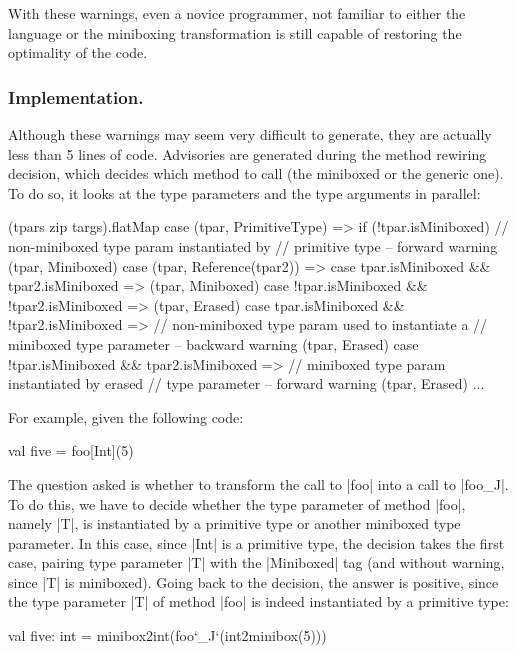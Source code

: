 With these warnings, even a novice programmer, not familiar to either the language or the miniboxing transformation is still capable of restoring the optimality of the code.

\subsubsection{Implementation.} Although these warnings may seem very difficult to generate, they are actually less than 5 lines of code. Advisories are generated during the method rewiring decision, which decides which method to call (the miniboxed or the generic one). To do so, it looks at the type parameters and the type arguments in parallel:

\begin{lstlisting-nobreak}
 (tpars zip targs).flatMap {
   case (tpar, PrimitiveType) =>
     if (!tpar.isMiniboxed)
       // non-miniboxed type param instantiated by
       // primitive type -- forward warning
     (tpar, Miniboxed)
   case (tpar, Reference(tpar2)) =>
     case tpar.isMiniboxed && tpar2.isMiniboxed =>
       (tpar, Miniboxed)
     case !tpar.isMiniboxed && !tpar2.isMiniboxed =>
       (tpar, Erased)
     case tpar.isMiniboxed && !tpar2.isMiniboxed =>
       // non-miniboxed type param used to instantiate a
       // miniboxed type parameter -- backward warning
       (tpar, Erased)
     case !tpar.isMiniboxed && tpar2.isMiniboxed =>
       // miniboxed type param instantiated by erased
       // type parameter -- forward warning
       (tpar, Erased)
   ...
 }
\end{lstlisting-nobreak}

For example, given the following code:

\begin{lstlisting-nobreak}
 val five = foo[Int](5)
\end{lstlisting-nobreak}

The question asked is whether to transform the call to |foo| into a call to |foo_J|. To do this, we have to decide whether the type parameter of method |foo|, namely |T|, is instantiated by a primitive type or another miniboxed type parameter. In this case, since |Int| is a primitive type, the decision takes the first case, pairing type parameter |T| with the |Miniboxed| tag (and without warning, since |T| is miniboxed). Going back to the decision, the answer is positive, since the type parameter |T| of method |foo| is indeed instantiated by a primitive type:

\begin{lstlisting-nobreak}
 val five: int = minibox2int(foo`_J`(int2minibox(5)))
\end{lstlisting-nobreak}


